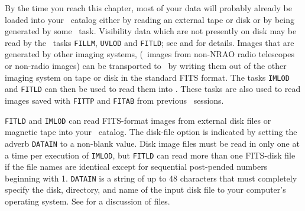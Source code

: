 
     By the time you reach this chapter, most of your data will
probably already be loaded into your \AIPS\ catalog either by reading
an external tape or disk or by being generated by some \AIPS\ task.
Visibility data which are not presently on disk may be read by the
\AIPS\ tasks {\tt FILLM}, {\tt UVLOD} and {\tt FITLD}; see
 and  for details.  Images that are
generated by other imaging systems, (\eg\ images from non-NRAO radio
telescopes or non-radio images) can be transported to \AIPS\ by
writing them out of the other imaging system on tape or disk in the
standard FITS format.  The tasks {\tt IMLOD} and {\tt FITLD} can then
be used to read them into \AIPS\@.  These tasks are also used to
read images saved with {\tt FITTP} and {\tt FITAB} from previous
\AIPS\ sessions.


     {\tt FITLD} and {\tt IMLOD} can read FITS-format images from
external disk files or magnetic tape into your \AIPS\ catalog.  The
disk-file option is indicated by setting the adverb {\tt DATAIN} to a
non-blank value.  Disk image files must be read in only one at a time
per execution of {\tt IMLOD}, but {\tt FITLD} can read more than one
FITS-disk file if the file names are identical except for sequential
post-pended numbers beginning with 1.  {\tt DATAIN} is a string of up
to 48 characters that must completely specify the disk, directory, and
name of the input disk file to your computer's operating system.  See
 for a discussion of  files.

